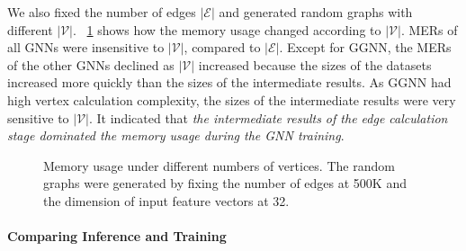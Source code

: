 We also fixed the number of edges $|\mathcal{E}|$ and generated random graphs with different $|\mathcal{V}|$.
%
\figurename~\ref{fig:exp_memory_expansion_ratio_input_graph_number_of_vertices_fixed_edge} shows how the memory usage changed according to $|\mathcal{V}|$.
%
MERs of all GNNs were insensitive to $|\mathcal{V}|$, compared to $|\mathcal{E}|$.
%
Except for GGNN, the MERs of the other GNNs declined as $|\mathcal{V}|$ increased because the sizes of the datasets increased more quickly than the sizes of the intermediate results.
%
As GGNN had high vertex calculation complexity, the sizes of the intermediate results were very sensitive to $|\mathcal{V}|$.
%
It indicated that \emph{the intermediate results of the edge calculation stage dominated the memory usage during the GNN training}.

\begin{figure}[H]
    \centering
    \caption{Memory usage under different numbers of vertices. The random graphs were generated by fixing the number of edges at 500K and the dimension of input feature vectors at 32.}
    \label{fig:exp_memory_expansion_ratio_input_graph_number_of_vertices_fixed_edge}
\end{figure}


\paragraph{Comparing Inference and Training}

